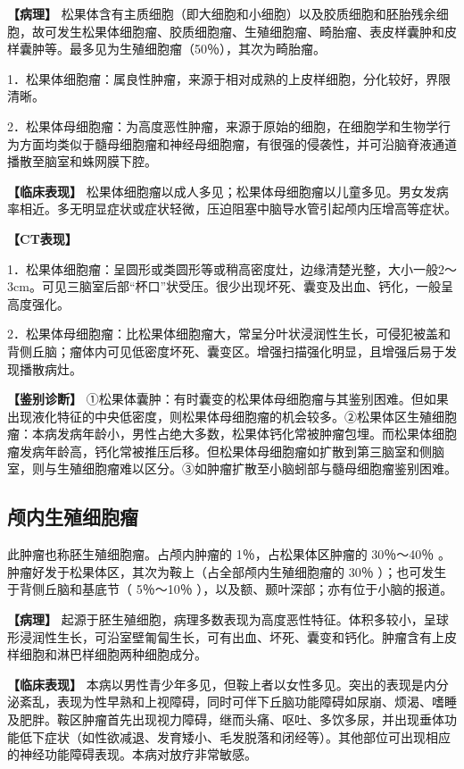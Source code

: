 \textbf{【病理】}
松果体含有主质细胞（即大细胞和小细胞）以及胶质细胞和胚胎残余细胞，故可发生松果体细胞瘤、胶质细胞瘤、生殖细胞瘤、畸胎瘤、表皮样囊肿和皮样囊肿等。最多见为生殖细胞瘤（50％），其次为畸胎瘤。

1．松果体细胞瘤：属良性肿瘤，来源于相对成熟的上皮样细胞，分化较好，界限清晰。

2．松果体母细胞瘤：为高度恶性肿瘤，来源于原始的细胞，在细胞学和生物学行为方面均类似于髓母细胞瘤和神经母细胞瘤，有很强的侵袭性，并可沿脑脊液通道播散至脑室和蛛网膜下腔。

\textbf{【临床表现】}
松果体细胞瘤以成人多见；松果体母细胞瘤以儿童多见。男女发病率相近。多无明显症状或症状轻微，压迫阻塞中脑导水管引起颅内压增高等症状。

\textbf{【CT表现】}

1．松果体细胞瘤：呈圆形或类圆形等或稍高密度灶，边缘清楚光整，大小一般2～3cm。可见三脑室后部“杯口”状受压。很少出现坏死、囊变及出血、钙化，一般呈高度强化。

2．松果体母细胞瘤：比松果体细胞瘤大，常呈分叶状浸润性生长，可侵犯被盖和背侧丘脑；瘤体内可见低密度坏死、囊变区。增强扫描强化明显，且增强后易于发现播散病灶。

\textbf{【鉴别诊断】}
①松果体囊肿：有时囊变的松果体母细胞瘤与其鉴别困难。但如果出现液化特征的中央低密度，则松果体母细胞瘤的机会较多。②松果体区生殖细胞瘤：本病发病年龄小，男性占绝大多数，松果体钙化常被肿瘤包埋。而松果体细胞瘤发病年龄高，钙化常被推压后移。但松果体母细胞瘤如扩散到第三脑室和侧脑室，则与生殖细胞瘤难以区分。③如肿瘤扩散至小脑蚓部与髓母细胞瘤鉴别困难。

\subsection{颅内生殖细胞瘤}

此肿瘤也称胚生殖细胞瘤。占颅内肿瘤的 1％，占松果体区肿瘤的 30％～40％
。肿瘤好发于松果体区，其次为鞍上（占全部颅内生殖细胞瘤的 30％
）；也可发生于背侧丘脑和基底节（ 5％～10％
），以及额、颞叶深部；亦有位于小脑的报道。

\textbf{【病理】}
起源于胚生殖细胞，病理多数表现为高度恶性特征。体积多较小，呈球形浸润性生长，可沿室壁匍匐生长，可有出血、坏死、囊变和钙化。肿瘤含有上皮样细胞和淋巴样细胞两种细胞成分。

\textbf{【临床表现】}
本病以男性青少年多见，但鞍上者以女性多见。突出的表现是内分泌紊乱，表现为性早熟和上视障碍，同时可伴下丘脑功能障碍如尿崩、烦渴、嗜睡及肥胖。鞍区肿瘤首先出现视力障碍，继而头痛、呕吐、多饮多尿，并出现垂体功能低下症状（如性欲减退、发育矮小、毛发脱落和闭经等）。其他部位可出现相应的神经功能障碍表现。本病对放疗非常敏感。

